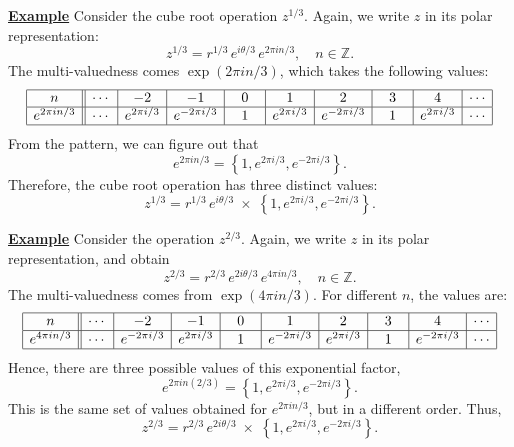 \documentclass[10pt,a4paper]{article}
\begin{document}
\begin{framed}
\noindent
\underline{\textbf{Example}}
\vskip 0.02in \noindent
Consider the cube root operation $z^{1/3}$. Again, we write $z$ in
its polar representation:
\begin{equation}
z^{1/3} = r^{1/3} \, e^{i\theta/3} \, e^{2\pi i n/3}, \quad n \in \mathbb{Z}.
\end{equation}
The multi-valuedness comes $\exp(2\pi i n/3)$, which takes the
following values:
\begin{equation*}
\begin{array}{|c||c|c|c|c|c|c|c|c|c|} \hline n &\cdots & -2 & -1 & 0 & 1 & 2 & 3 & 4 & \cdots \\ \hline e^{2\pi i n/3} &\cdots & e^{2\pi i /3} & e^{-2\pi i /3} & \;\,\;1\;\,\; & e^{2\pi i /3} & e^{-2\pi i /3} & \;\,\;1\;\,\; & e^{2\pi i /3} & \cdots \\ \hline \end{array}
\end{equation*}
From the pattern, we can figure out that
\begin{equation}
  e^{2\pi i n/3} = \left\{1, e^{2\pi i /3}, e^{-2\pi i /3}\right\}.
\end{equation}
Therefore, the cube root operation has three distinct values:
\begin{equation}
  z^{1/3} = r^{1/3} \, e^{i\theta/3} \;\times\;
  \left\{1, e^{2\pi i /3}, e^{-2\pi i /3}\right\}.
\end{equation}
\end{framed}

\begin{framed}
\noindent
\underline{\textbf{Example}}
\vskip 0.02in \noindent
Consider the operation $z^{2/3}$. Again, we write $z$ in its polar
representation, and obtain
\begin{equation}
z^{2/3} = r^{2/3} \, e^{2i\theta/3} \, e^{4\pi i n/3}, \quad n \in \mathbb{Z}.
\end{equation}
The multi-valuedness comes from $\exp(4\pi i n/3)$.  For different
$n$, the values are:
\begin{equation*}
\begin{array}{|c||c|c|c|c|c|c|c|c|c|} \hline n &\cdots & -2 & -1 & 0 & 1 & 2 & 3 & 4 & \cdots \\ \hline e^{4\pi i n/3} &\cdots & e^{-2\pi i /3} & e^{2\pi i /3} & \;\,\;1\;\,\; & e^{-2\pi i /3} & e^{2\pi i /3} & \;\,\;1\;\,\; & e^{-2\pi i /3} & \cdots \\ \hline \end{array}
\end{equation*}
Hence, there are three possible values of this exponential factor,
\begin{equation}
  e^{2\pi i n (2/3)} = \left\{1, e^{2\pi i /3}, e^{-2\pi i /3}\right\}.
\end{equation}
This is the same set of values obtained for $e^{2\pi i n/3}$, but in a
different order.  Thus,
\begin{equation}
  z^{2/3} = r^{2/3} \, e^{2i\theta/3} \;\times\;
  \left\{1, e^{2\pi i /3}, e^{-2\pi i /3}\right\}.
\end{equation}
\end{framed}
\end{document}
